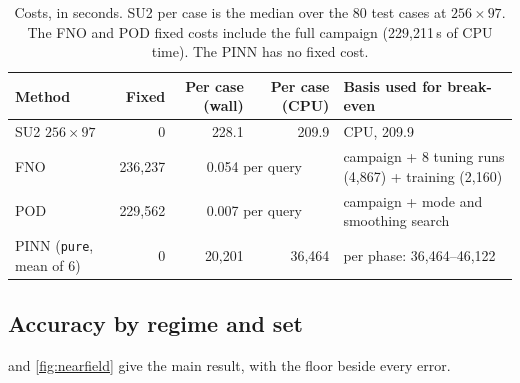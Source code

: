 \documentclass[11pt]{article}
\begin{document}
\begin{table}[t]
\centering\small
\caption{Costs, in seconds. SU2 per case is the median over the 80 test cases at $256\times97$.
The FNO and POD fixed costs include the full campaign (229,211\,s of CPU time). The PINN has no
fixed cost.}
\label{tab:costs}
\begin{tabularx}{\textwidth}{@{}lrrr>{\raggedright\arraybackslash}X@{}}
\toprule
Method & Fixed & Per case (wall) & Per case (CPU) & Basis used for break-even\\
\midrule
SU2 $256\times97$ & 0 & 228.1 & 209.9 & CPU, 209.9\\
FNO & 236,237 & \multicolumn{2}{c}{0.054 per query} & campaign + 8 tuning runs (4,867) + training (2,160)\\
POD & 229,562 & \multicolumn{2}{c}{0.007 per query} & campaign + mode and smoothing search\\
PINN (\texttt{pure}, mean of 6) & 0 & 20,201 & 36,464 & per phase: 36,464--46,122\\
\bottomrule
\end{tabularx}
\end{table}

\subsection{Accuracy by regime and set}

 and \cref{fig:nearfield} give the main result, with the floor beside every error.
\end{document}

